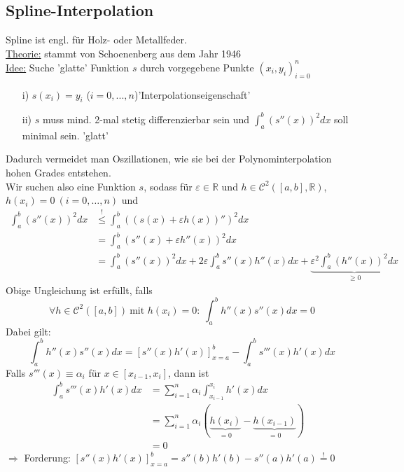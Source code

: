 \documentclass[12pt]{article}
\theoremstyle{break}
\begin{document}
\subsection{Spline-Interpolation}
Spline ist engl. für Holz- oder Metallfeder.\\
\underline{Theorie:} stammt von Schoenenberg aus dem Jahr 1946\\
\underline{Idee:} Suche 'glatte' Funktion $s$ durch vorgegebene Punkte $(x_i, y_i)_{i=0}^n$
\begin{enumerate}
  \item[i)] $s(x_i)= y_i$ ($i=0,...,n$)'Interpolationseigenschaft'
  \item[ii)] $s$ muss mind. 2-mal stetig differenzierbar sein und $ \int_a^b (s''(x))^2dx $ soll minimal sein. 'glatt'
\end{enumerate}
Dadurch vermeidet man Oszillationen, wie sie bei der Polynominterpolation hohen Grades entstehen.\\
Wir suchen also eine Funktion $s$, sodass für $\varepsilon \in \mathbb{R}$ und $h \in \mathcal{C}^2([a,b], \mathbb{R})$, $h(x_i) = 0 \medspace (i=0,\ldots,n)$ und 
\begin{align*}
\int_a^b (s''(x))^2 dx &\overset{!}{\leq} \int_a^b \left( (s(x) + \varepsilon h(x))'' \right)^2 dx &\\
&= \int_a^b (s''(x) + \varepsilon h''(x))^2 dx &\\
&= \int_a^b (s''(x))^2 dx + 2\varepsilon \int_a^b s''(x)h''(x) dx + \underbrace{\varepsilon^2\int_a^b (h''(x))^2dx}_{ \geq 0 } 
\end{align*}
Obige Ungleichung ist erfüllt, falls 
$$ \forall h \in \mathcal{C}^2([a,b]) \medspace \text{mit }h(x_i) = 0: \medspace \int_a^b h''(x) s''(x) dx = 0$$
Dabei gilt:
$$ \int_a^b h''(x) s''(x) dx = \left[ s''(x) h'(x) \right]_{x=a}^b - \int_a^b s'''(x) h'(x)dx$$
Falls $s'''(x) \equiv \alpha_i$ für $x \in [x_{i-1}, x_i]$, dann ist 
\begin{align*}
\int_a^b s'''(x) h'(x) dx &= \sum_{i=1}^n \alpha_i \int_{x_{i-1}}^{x_i} h'(x) dx &\\
&= \sum_{i=1}^n \alpha_i \left(\underbrace{h(x_i)}_{= 0} - \underbrace{h(x_{i-1})}_{= 0}\right) &\\
&= 0
\end{align*}
$\Rightarrow$ Forderung: $\left[s''(x) h'(x) \right]_{x=a}^b = s''(b)h'(b) - s''(a)h'(a) \overset{!}{=} 0$
\end{document}
